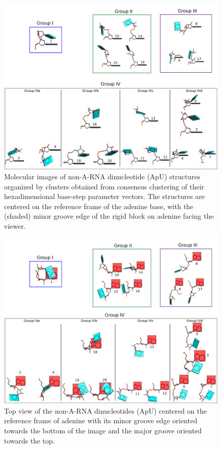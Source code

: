 \begin{figure}[htbp]
 \centering
\includegraphics[angle=90, scale=0.46]{Chapter2/collageb.png}
 \caption{Molecular images of  non-A-RNA dinucleotide (ApU) structures
   organized by  clusters obtained from consensus  clustering of their
   hexadimensional  base-step parameter  vectors.  The  structures are
   centered  on the  reference frame  of  the adenine  base, with  the
   (shaded) minor groove edge of the rigid block on adenine facing the
   viewer.}
 \label{fig:nonAclus}
\end{figure}

\begin{figure}
\centering
\includegraphics[angle=90, scale=0.5]{Chapter2/collage2.png}
\caption{Top view of the non-A-RNA dinucleotides (ApU) centered on the
  reference frame of adenine with its minor  groove edge oriented
  towards  the bottom  of  the  image and  the  major groove  oriented
  towards the top.}
\label{fig:steps2}
\end{figure}

